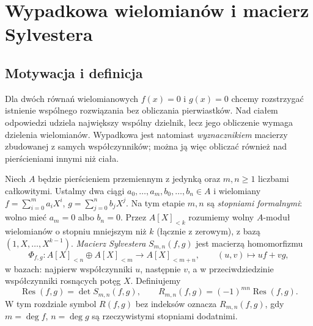 \chapter{Wypadkowa wielomianów i macierz Sylvestera}\label{aa:ch:resultant}

\section{Motywacja i definicja}
Dla dwóch równań wielomianowych $f(x)=0$ i $g(x)=0$ chcemy
rozstrzygać istnienie wspólnego rozwiązania bez obliczania pierwiastków.
Nad ciałem odpowiedzi udziela największy wspólny dzielnik, lecz
jego obliczenie wymaga dzielenia wielomianów. Wypadkowa jest natomiast
\emph{wyznacznikiem} macierzy zbudowanej z samych współczynników;
można ją więc obliczać również nad pierścieniami innymi niż ciała.

\begin{definicja}\label{aa:def:sylvester}
Niech $A$ będzie pierścieniem przemiennym z jedynką oraz
$m,n\ge1$ liczbami całkowitymi. Ustalmy dwa ciągi
$a_0,\ldots,a_m,b_0,\ldots,b_n\in A$ i wielomiany
$f=\sum_{i=0}^m a_iX^i$, $g=\sum_{j=0}^n b_jX^j$.
Na tym etapie $m,n$ są \emph{stopniami formalnymi}: wolno mieć
$a_m=0$ albo $b_n=0$. Przez $A[X]_{<k}$ rozumiemy wolny
$A$-moduł wielomianów o stopniu mniejszym niż $k$ (łącznie z zerowym),
z bazą $(1,X,\ldots,X^{k-1})$.
\emph{Macierz Sylvestera} $S_{m,n}(f,g)$ jest macierzą homomorfizmu
\[
 \Phi_{f,g}:A[X]_{<n}\oplus A[X]_{<m}\longrightarrow A[X]_{<m+n},
 \qquad (u,v)\longmapsto uf+vg,
\]
w bazach: najpierw współczynniki $u$, następnie $v$, a w przeciwdziedzinie
współczynniki rosnących potęg $X$.
Definiujemy
\[
 \operatorname{Res}(f,g)=\det S_{m,n}(f,g),\qquad
 R_{m,n}(f,g)=(-1)^{mn}\operatorname{Res}(f,g).
\]
W tym rozdziale symbol $R(f,g)$ bez indeksów oznacza $R_{m,n}(f,g)$,
gdy $m=\deg f$, $n=\deg g$ są rzeczywistymi stopniami dodatnimi.
\end{definicja}

